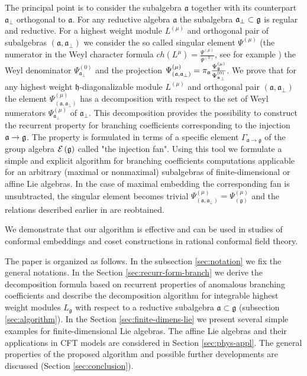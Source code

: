 \documentclass[12pt]{iopart}
\theoremstyle{definition}
\newcommand{\gf}{\mathfrak{g}}
\newcommand{\af}{\mathfrak{a}}
\newcommand{\afb}{\mathfrak{a}_{\bot}}
\newcommand{\hf}{\mathfrak{h}}
\begin{document}
The principal point is to consider the subalgebra $\af$ together with its
counterpart $\afb$ orthogonal to $\af$.
For any reductive algebra $\af$ the subalgebra $\afb \subset \frak{g} $ is regular and reductive.
For a highest weight module $L^{\left( \mu \right)}$ and orthogonal pair of subalgebras
$\left(  \af, \afb \right)$ we consider
the so called singular element $\Psi^{\left( \mu \right)}$ (the numerator
in the Weyl character formula
$ch\left( L^{\mu }\right) =\frac{\Psi ^{\left( \mu \right) }}{\Psi ^{\left( 0\right) }}$,
see for example \cite{humphreys1997introduction})
the Weyl denominator $\Psi ^{\left( 0\right) }_{\afb}$ and the projection
$\Psi ^{\left( \mu \right) }_{\left(  \af, \afb \right)}
=\pi_{\af}\frac{\Psi ^{\left( \mu \right) }_{\frak{g}}}{\Psi ^{\left( 0\right) }_{\afb}}$.
We prove that for any highest weight $\hf$-diagonalizable module $L^{\left( \mu \right)}$ and orthogonal pair
$\left(  \af, \afb \right)$ the element
$\Psi ^{\left( \mu \right) }_{\left(  \af, \afb \right)}$ has a decomposition with respect to
the set of Weyl numerators $\Psi ^{\left( \mu \right) }_{ \afb }$ of $\afb$.
This decomposition provides the possibility to construct the recurrent property for branching coefficients corresponding
to the injection $\frak{a} \rightarrow \frak{g} $.
The property is formulated in
terms of a specific element $\Gamma_{\af \rightarrow \gf}$ of the group algebra
$\mathcal{E}\left( \frak{g} \right)$ called "the injection fan".
Using this tool we formulate a simple and
explicit algorithm for branching coefficients computations applicable for an arbitrary (maximal or nonmaximal)
subalgebras of finite-dimensional or affine Lie algebras.
In the case of maximal embedding the corresponding fan is unsubtracted, the singular element
becomes trivial
$\Psi ^{\left( \mu \right) }_{\left(  \af, \afb \right)}=\Psi ^{\left( \mu \right) }_{\left(  \gf\right)}$
and the relations described earlier in \cite{ilyin812pbc} are reobtained.

We demonstrate that our algorithm is effective and can be used in studies
of conformal embeddings and coset constructions in rational conformal field theory.

The paper is organized as follows. In the subsection \ref{sec:notation}  we fix the general notations.
In the Section \ref{sec:recurr-form-branch} we derive the decomposition formula based on
recurrent properties of anomalous branching coefficients and describe the decomposition algorithm
for integrable highest weight modules
$L_{\mathfrak{g}}$ with respect to a reductive subalgebra $\mathfrak{a}\subset \mathfrak{g}$
(subsection \ref{sec:algorithm}). In the Section \ref{sec:finite-dimens-lie} we present several
simple examples for finite-dimensional Lie algebras. The affine Lie algebras and their applications in
CFT models are considered in Section \ref{sec:phys-appl}.
The general properties of the proposed algorithm and
possible further developments are discussed (Section \ref{sec:conclusion}).
\end{document}
